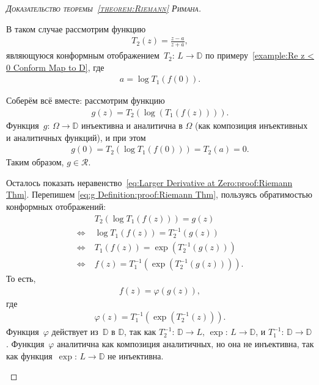 \documentclass[../complex-analysis.tex]{subfiles}
\begin{document}
\begin{proof}[\normalfont\textsc{Доказательство теоремы~\ref{theorem:Riemann} Римана}]
\begin{enumerate}
   В таком случае рассмотрим функцию
   \begin{align*}
    T_2(z) = \frac{z-a}{z+\overline a},
   \end{align*} являющуюся конформным отображением~$ T_2 \colon\, L \to \mathbb D $ по примеру~\ref{example:Re z < 0 Conform Map to D}, где
   \begin{align*}
    a = \log T_1(f(0)).
   \end{align*}

   Соберём всё вместе: рассмотрим функцию
   \begin{align}
    \label{eq:g Definition:proof:Riemann Thm}
    g(z) = T_2(\log(T_1(f(z)))).
   \end{align} Функция~$ g \colon\,\Omega \to \mathbb D $ инъективна и аналитична в $ \Omega $ (как композиция инъективных и аналитичных функций), и при этом
   \begin{align*}
    g(0) = T_2(\log T_1(f(0))) = T_2(a) = 0.
   \end{align*} Таким образом, $ g \in \mathcal R $.

   Осталось показать неравенство~\eqref{eq:Larger Derivative at Zero:proof:Riemann Thm}. Перепишем \eqref{eq:g Definition:proof:Riemann Thm}, пользуясь обратимостью конформных отображений:
   \begin{align*}
    &T_2(\log T_1(f(z))) = g(z)\\
    \iff\;&\log T_1(f(z)) = T_2^{-1}(g(z))\\
    \iff\;&T_1(f(z)) = \exp(T_2^{-1}(g(z)))\\
    \iff\;&f(z) = T_1^{-1}(\exp(T_2^{-1}(g(z)))).
   \end{align*} То есть,
   \begin{align*}
    f(z) = \varphi(g(z)),
   \end{align*} где
   \begin{align*}
    \varphi(z) = T_1^{-1}(\exp(T_2^{-1}(z))).
   \end{align*} Функция~$ \varphi $ действует из~$ \mathbb D $ в $ \mathbb D $, так как $ T_2^{-1}\colon\,\mathbb D \to L $, $ \exp\colon\,L \to \mathbb D $, и $ T_1^{-1}\colon\,\mathbb D \to \mathbb D $. Функция~$ \varphi $ аналитична как композиция аналитичных, но она не инъективна, так как функция~$ \exp\colon\,L\to\mathbb D $ не инъективна.


\end{enumerate}
\end{proof}
\end{document}
